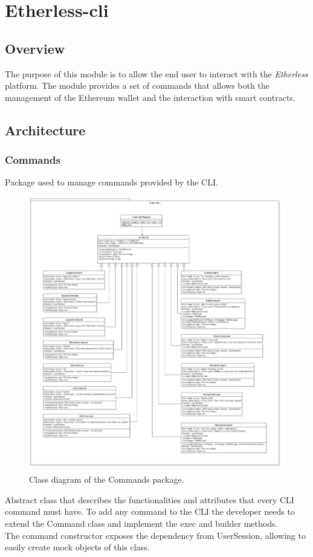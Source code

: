 \section{Etherless-cli}

	\subsection{Overview}
	The purpose of this module is to allow the end user to interact with the \textit{Etherless} platform. The module provides a set of commands that allows both the management of the Ethereum wallet and the interaction with smart contracts.

	\subsection{Architecture}
		\subsubsection{Commands}
		Package used to manage commands provided by the CLI.
		\begin{figure} [H]
			\centering
			\includegraphics[width=0.6\linewidth]{diagrammi/etherless-cli/Commands}
			\caption{Class diagram of the Commands package.}
		\end{figure}

			Abstract class that describes the functionalities and attributes that every CLI command must have. To add any command to the CLI the developer needs to extend the Command class and implement the exec and builder methods. \\
			The command constructor exposes the dependency from UserSession, allowing to easily create mock objects of this class.

